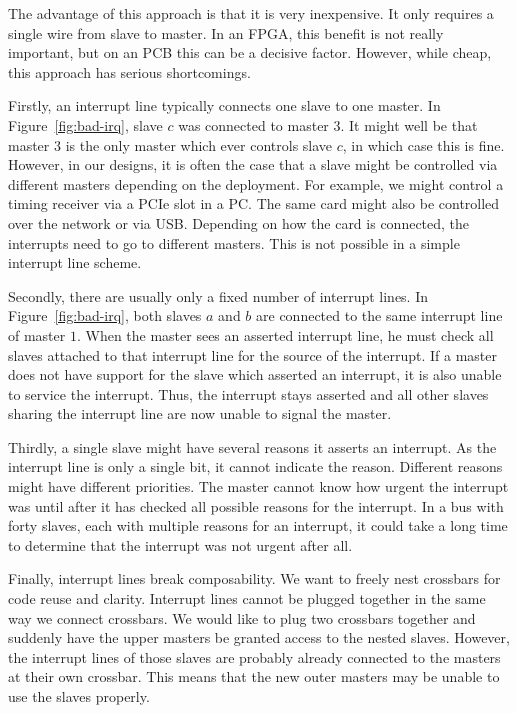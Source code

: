 \documentclass[a4paper]{jacow}
\begin{document}
The advantage of this approach is that it is very inexpensive.
It only requires a single wire from slave to master.
In an FPGA, this benefit is not really important, 
but on an PCB this can be a decisive factor.
However, while cheap, this approach has serious shortcomings.

Firstly, an interrupt line typically connects one slave to one master.
In Figure~\ref{fig:bad-irq}, slave $c$ was connected to master $3$.
It might well be that master $3$ is the only master which ever controls
slave $c$, in which case this is fine.
However, in our designs, it is often the case that a slave might be
controlled via different masters depending on the deployment.
For example, we might control a timing receiver via a PCIe slot in a PC.
The same card might also be controlled over the network or via USB.
Depending on how the card is connected, the interrupts need to go to
different masters.
This is not possible in a simple interrupt line scheme.

Secondly, there are usually only a fixed number of interrupt lines.
In Figure~\ref{fig:bad-irq}, both slaves $a$ and $b$ are connected to the
same interrupt line of master $1$.
When the master sees an asserted interrupt line, he must check all slaves
attached to that interrupt line for the source of the interrupt.
If a master does not have support for the slave which asserted an
interrupt, it is also unable to service the interrupt.
Thus, the interrupt stays asserted and all other slaves sharing the
interrupt line are now unable to signal the master.

Thirdly, a single slave might have several reasons it asserts an interrupt.  
As the interrupt line is only a single bit, it cannot indicate the reason.
Different reasons might have different priorities.
The master cannot know how urgent the interrupt was until after it has
checked all possible reasons for the interrupt.
In a bus with forty slaves, each with multiple reasons for an interrupt,
it could take a long time to determine that the interrupt was not urgent
after all.

Finally, interrupt lines break composability.
We want to freely nest crossbars for code reuse and clarity.
Interrupt lines cannot be plugged together in the same way we connect
crossbars.
We would like to plug two crossbars together and suddenly have the upper
masters be granted access to the nested slaves.
However, the interrupt lines of those slaves are probably already connected
to the masters at their own crossbar.
This means that the new outer masters may be unable to use the slaves
properly.
\end{document}
